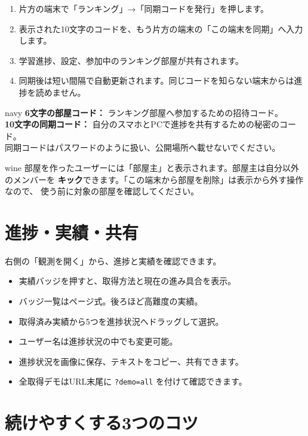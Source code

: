 \documentclass[11pt,a4paper]{ltjsarticle}
\begin{document}
\begin{enumerate}
\item 片方の端末で「ランキング」→「同期コードを発行」を押します。
\item 表示された10文字のコードを、もう片方の端末の「この端末を同期」へ入力します。
\item 学習進捗、設定、参加中のランキング部屋が共有されます。
\item 同期後は短い間隔で自動更新されます。同じコードを知らない端末からは進捗を読めません。
\end{enumerate}

\begin{casebox}[2種類のコードを区別]{navy}
\textbf{6文字の部屋コード：} ランキング部屋へ参加するための招待コード。\\
\textbf{10文字の同期コード：} 自分のスマホとPCで進捗を共有するための秘密のコード。\\
同期コードはパスワードのように扱い、公開場所へ載せないでください。
\end{casebox}

\begin{casebox}[部屋主だけができること]{wine}
部屋を作ったユーザーには「部屋主」と表示されます。部屋主は自分以外のメンバーを
\textbf{キック}できます。「この端末から部屋を削除」は表示から外す操作なので、
使う前に対象の部屋を確認してください。
\end{casebox}

\section*{進捗・実績・共有}

右側の「観測を開く」から、進捗と実績を確認できます。

\begin{itemize}
\item 実績バッジを押すと、取得方法と現在の進み具合を表示。
\item バッジ一覧はページ式。後ろほど高難度の実績。
\item 取得済み実績から5つを進捗状況へドラッグして選択。
\item ユーザー名は進捗状況の中でも変更可能。
\item 進捗状況を画像に保存、テキストをコピー、共有できます。
\item 全取得デモはURL末尾に \texttt{?demo=all} を付けて確認できます。
\end{itemize}

\section*{続けやすくする3つのコツ}
\end{document}
